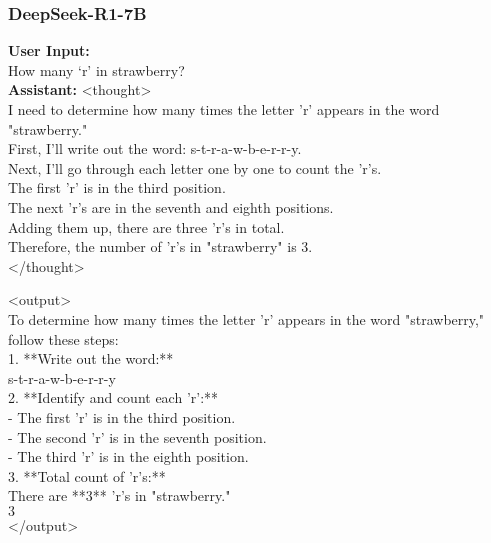 \subsubsection{DeepSeek-R1-7B}

\begin{abox} 
\textbf{User Input:}\\
How many `r' in strawberry?\\

\textbf{Assistant:}
 <thought>\\
I need to determine how many times the letter 'r' appears in the word "strawberry."\\

First, I'll write out the word: s-t-r-a-w-b-e-r-r-y.\\

Next, I'll go through each letter one by one to count the 'r's.\\

The first 'r' is in the third position.\\

The next 'r's are in the seventh and eighth positions.\\

Adding them up, there are three 'r's in total.\\

Therefore, the number of 'r's in "strawberry" is 3.\\
</thought>\\
\end{abox}
\begin{abox}
<output>\\
To determine how many times the letter 'r' appears in the word "strawberry," follow these steps:\\

1. **Write out the word:**  \\
   s-t-r-a-w-b-e-r-r-y\\

2. **Identify and count each 'r':**  \\
   - The first 'r' is in the third position.\\
   - The second 'r' is in the seventh position.\\
   - The third 'r' is in the eighth position.\\

3. **Total count of 'r's:**  \\
   There are **3** 'r's in "strawberry."\\

$
\boxed{3}
$\\
</output>

\end{abox}


